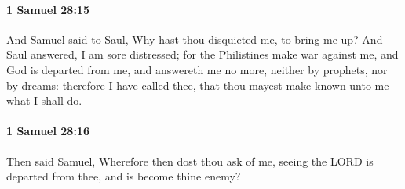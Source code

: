 		\paragraph{1 Samuel 28:15} %
			\label{1SAMUEL-28-15}

			And Samuel said to Saul, Why hast thou disquieted me, to bring me up? And Saul answered, I am sore distressed; for the Philistines make war against me, and God is departed from me, and answereth me no more, neither by prophets, nor by dreams: therefore I have called thee, that thou mayest make known unto me what I shall do.


		\paragraph{1 Samuel 28:16} %
			\label{1SAMUEL-28-16}

			Then said Samuel, Wherefore then dost thou ask of me, seeing the LORD is departed from thee, and is become thine enemy?

